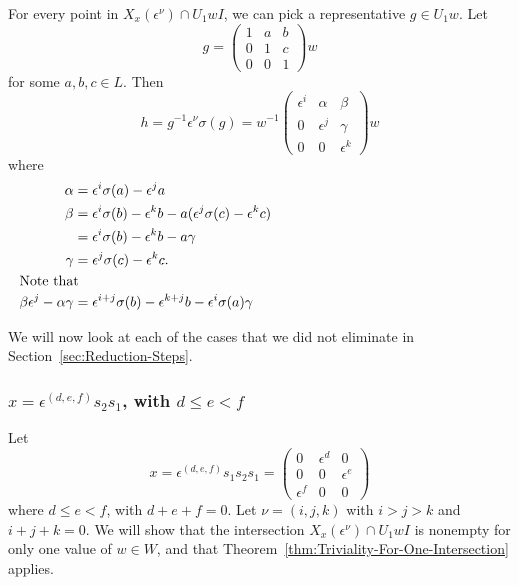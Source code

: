 \documentclass{amsart}
\theoremstyle{definition}
\def\e{\epsilon}
\def\s{\sigma}
\def\en{\e^{\nu}}
\def\X{X_x(\en)}
\begin{document}
  For every point in $\X \cap U_1 wI$, we can pick a representative $g \in
  U_1 w$.  Let
  \begin{equation*}
    g = \begin{pmatrix}
      1 & a & b \\
      0 & 1 & c \\
      0 & 0 & 1
    \end{pmatrix}w
  \end{equation*}
  for some $a,b,c \in L$.  Then
  \begin{equation}
    \label{eq:image-matrix}
    h = g^{-1}\en\s(g) = w^{-1}\begin{pmatrix}
      \e^i & \alpha & \beta \\
      0 & \e^j & \gamma \\
      0 & 0 & \e^k
    \end{pmatrix}w
  \end{equation} where
  \begin{align}
    \label{eq:alpha}
    \alpha & = \e^i\s(a) - \e^j a \\
    \label{eq:beta}
    \beta & = \e^i\s(b) - \e^k b - a(\e^j \s(c) - \e^k c) \\
    \label{eq:altbeta}
          &= \e^i\s(b) - \e^k b - a\gamma \\
    \label{eq:gamma}
    \gamma & = \e^j \s(c) - \e^k c. \\
    \noalign{\noindent Note that}
    \label{eq:minor}
    \beta\e^j - \alpha\gamma &= \e^{i+j}\s(b) - \e^{k+j} b - \e^i\s(a)\gamma
  \end{align}

  We will now look at each of the cases that we did not eliminate in
  Section~\ref{sec:Reduction-Steps}.

  \subsubsection{$x = \e^{(d, e, f)}s_2 s_1$, with $d \le e < f$}
  Let
  \begin{equation}
    x = \e^{(d, e, f)}s_1 s_2 s_1 = \begin{pmatrix}
        0 & \e^d & 0 \\
        0 & 0 & \e^e  \\
        \e^f & 0 & 0
      \end{pmatrix}
  \end{equation}
  where $d \le e < f$, with $d + e + f = 0$.  Let $\nu = (i, j, k)$
  with $i > j > k$ and $i + j + k = 0$.  We will show that the intersection $\X
  \cap U_1 wI$ is nonempty for only one value of $w \in W$, and that
  Theorem~\ref{thm:Triviality-For-One-Intersection} applies.
\end{document}
